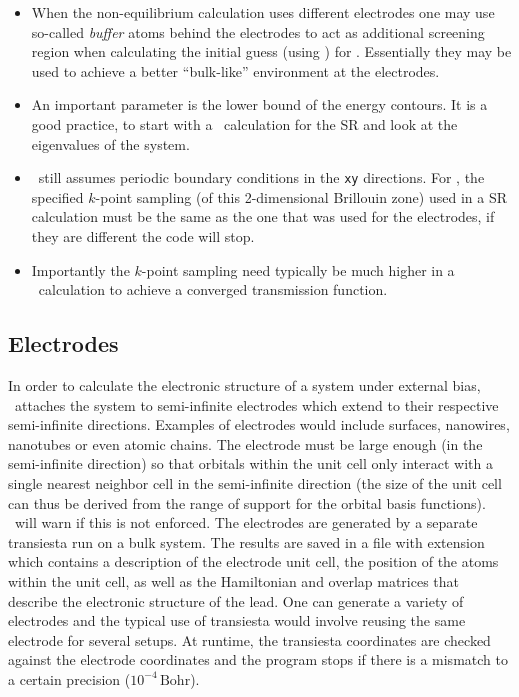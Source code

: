 \begin{itemize}
  \item %
  When the non-equilibrium calculation uses different electrodes one
  may use so-called \emph{buffer} atoms behind the electrodes to act
  as additional screening region when calculating the initial guess
  (using \siesta) for \tsiesta. Essentially they may be used to
  achieve a better ``bulk-like'' environment at the electrodes.

  
  \item%
  An important parameter is the lower bound of the energy contours. It
  is a good practice, to start with a \siesta\ calculation for the SR
  and look at the eigenvalues of the system. 

  \item%
  \tsiesta\ still assumes periodic boundary conditions in the
  \texttt{xy} directions. For \tsiesta, the specified $k$-point
  sampling (of this 2-dimensional Brillouin zone) used in a SR
  calculation must be the same as the one that was used for the
  electrodes, if they are different the code will stop. 

  \item%
  Importantly the $k$-point sampling need typically be much higher in
  a \tbtrans\ calculation to achieve a converged transmission
  function.

\end{itemize}

\subsection{Electrodes}

In order to calculate the electronic structure of a system under
external bias, \tsiesta\ attaches the system to semi-infinite
electrodes which extend to their respective semi-infinite
directions. Examples of electrodes would include surfaces, nanowires,
nanotubes or even atomic chains. The electrode must be large enough
(in the semi-infinite direction) so that orbitals within the unit cell
only interact with a single nearest neighbor cell in the semi-infinite
direction (the size of the unit cell can thus be derived from the
range of support for the orbital basis functions). \tsiesta\ will warn
if this is not enforced. The electrodes are generated by a separate
transiesta run on a bulk system. The results are saved in a file with
extension  which contains a description of the electrode
unit cell, the position of the atoms within the unit cell, as well as
the Hamiltonian and overlap matrices that describe the electronic
structure of the lead. One can generate a variety of electrodes and
the typical use of transiesta would involve reusing the same electrode
for several setups. At runtime, the transiesta coordinates are checked
against the electrode coordinates and the program stops if there is a
mismatch to a certain precision ($10^{-4}\,\mathrm{Bohr}$).


